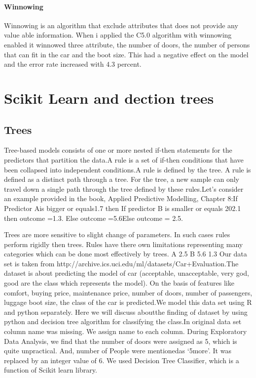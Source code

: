 \documentclass[a4paper, 12pt]{article}
\begin{document}
\paragraph{Winnowing}
Winnowing is an algorithm that exclude attributes that does not provide any value able information. When i applied the C5.0 algorithm with winnowing enabled it winnowed three attribute, the number of doors, the number of persons that can fit in the car and the boot size. This had a negative effect on the model and the error rate increased with 4.3 percent.

\section{Scikit Learn and dection trees}
\subsection{Trees}
Tree-based models consists of one or more nested if-then statements for the predictors that partition the data.A rule is a set of if-then conditions that have been collapsed into independent conditions.A rule is defined by the tree. A rule is defined as a distinct path through a tree. For the tree, a new sample can only travel down a single path through the tree defined by these rules.Let’s consider an example provided in the book, Applied Predictive Modelling, Chapter 8:If Predictor Ais bigger or equals1.7 then     If predictor B is smaller or equals 202.1 then outcome =1.3. Else outcome =5.6Else outcome = 2.5.

Trees are more sensitive to slight change of parameters. In such cases rules perform rigidly then trees. Rules have there own limitations representing many categories which can be done most effectively by trees.  A  2.5  B  5.6  1.3
Our data set is taken from http://archive.ics.uci.edu/ml/datasets/Car+Evaluation.The dataset is about predicting the model of car (acceptable, unacceptable, very god, good are the class which represents the model). On the basis of features like comfort, buying price, maintenance price, number of doors, number of passengers, luggage boot size, the class of the car is predicted.We model this data set using R and python separately. Here we will discuss aboutthe finding of dataset by using python and decision tree algorithm for classifying the class.In original data set column name was missing. We assign name to each column. During Exploratory Data Analysis, we find that the number of doors were assigned as 5, which is quite unpractical. And, number of People were mentionedas ‘5more’. It was replaced by an integer value of 6. We used Decision Tree Classifier, which is a function of Scikit learn library.
\end{document}
